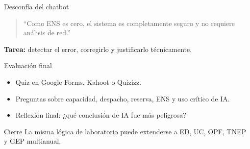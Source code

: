 \documentclass[aspectratio=169]{beamer}
\begin{document}
\begin{frame}{Desconfía del chatbot}
  \begin{quote}
  ``Como ENS es cero, el sistema es completamente seguro y no requiere análisis de red.''
  \end{quote}

  \textbf{Tarea:} detectar el error, corregirlo y justificarlo técnicamente.
\end{frame}

\begin{frame}{Evaluación final}
  \begin{itemize}
    \item Quiz en Google Forms, Kahoot o Quizizz.
    \item Preguntas sobre capacidad, despacho, reserva, ENS y uso crítico de IA.
    \item Reflexión final: ¿qué conclusión de IA fue más peligrosa?
  \end{itemize}
\end{frame}

\begin{frame}{Cierre}
  La misma lógica de laboratorio puede extenderse a ED, UC, OPF, TNEP y GEP multianual.
\end{frame}
\end{document}
